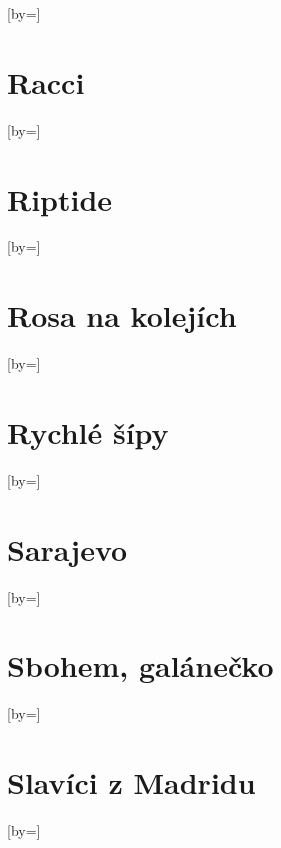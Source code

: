 \documentclass{article}
\begin{document}
\begin{songs}{}
\begin{song}{}[by={}]
\endverse
\end{song}

\section{Racci}
\begin{song}{}[by={}]
\beginverse

\endverse
\end{song}

\section{Riptide}
\begin{song}{}[by={}]
\beginverse

\endverse
\end{song}

\section{Rosa na kolejích}
\begin{song}{}[by={}]
\beginverse

\endverse
\end{song}

\section{Rychlé šípy}
\begin{song}{}[by={}]
\beginverse

\endverse
\end{song}

\section{Sarajevo}
\begin{song}{}[by={}]
\beginverse

\endverse
\end{song}

\section{Sbohem, galánečko}
\begin{song}{}[by={}]
\beginverse

\endverse
\end{song}

\section{Slavíci z Madridu}
\begin{song}{}[by={}]
\beginverse


\end{song}
\end{songs}
\end{document}
